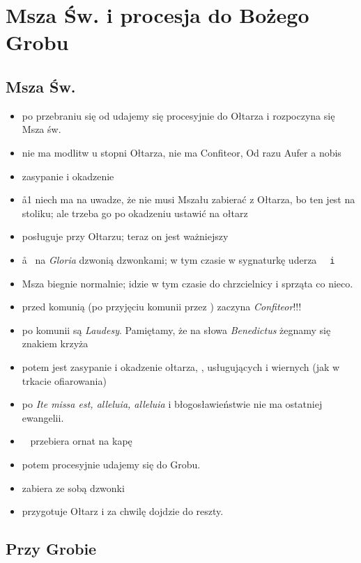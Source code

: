 \section{Msza Św. i procesja do Bożego Grobu}

\subsection{Msza Św.}

\begin{itemize}
	\item po przebraniu się od udajemy się procesyjnie do Ołtarza i rozpoczyna
	      się Msza św.
	\item nie ma modlitw u stopni Ołtarza, nie ma Confiteor, Od razu Aufer a
	      nobis
	\item zasypanie i okadzenie
	\item \aa1 niech ma	na uwadze, że nie musi Mszału zabierać z Ołtarza, bo ten
	      jest na stoliku; ale trzeba go po okadzeniu ustawić na ołtarz
	\item {} posługuje przy Ołtarzu; teraz on jest ważniejszy
	\item \aa~ na \textit{Gloria} dzwonią dzwonkami; w tym czasie w sygnaturkę
	      uderza \tt~ i 
	\item Msza biegnie normalnie;  idzie w tym czasie do chrzcielnicy i
	      sprząta co nieco.
	\item przed komunią (po przyjęciu komunii przez \ii)  zaczyna
	      \textit{Confiteor}!!!
	\item po komunii są \textit{Laudesy}. Pamiętamy, że na słowa
	      \textit{Benedictus} żegnamy się znakiem krzyża
	\item potem	jest zasypanie i okadzenie ołtarza, \ii, usługujących i wiernych
	      (jak w trkacie ofiarowania)
	\item po \textit{Ite missa est, alleluia, alleluia} i błogosławieństwie nie
	      ma ostatniej ewangelii.
	\item \ii~ przebiera ornat na kapę
	\item potem procesyjnie udajemy się do Grobu.
	\item {} zabiera ze sobą dzwonki
	\item {} przygotuje Ołtarz i za chwilę dojdzie do reszty.
\end{itemize}

\subsection{Przy Grobie}

